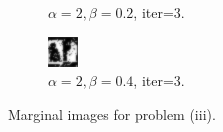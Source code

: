 \documentclass{article}
\begin{document}
\begin{figure}[t]
\begin{subfigure}[t]{0.27\textwidth}
  \vspace{-0.6cm}
  \caption{$\alpha=2, \beta=0.2$, iter=$3$.}
\end{subfigure}
\begin{subfigure}[t]{0.27\textwidth}
  \centering
  \includegraphics[width=\textwidth]{iii_alpha_2_beta_0.4_iterations_4.bmp}
  \vspace{-0.6cm}
  \caption{$\alpha=2, \beta=0.4$, iter=$3$.}
\end{subfigure}
\vspace{-0.3cm}
\caption{Marginal images for problem (iii).}
\label{f:denoise_iii}
\end{figure}
\end{document}
